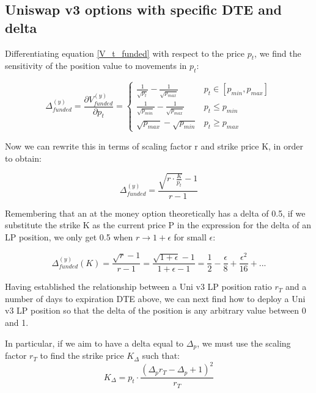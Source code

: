 \documentclass{article}
\begin{document}
\subsection{Uniswap v3 options with specific DTE and delta}
Differentiating equation \eqref{V_t_funded} with respect to the price $p_t$, we find the sensitivity of the position value to movements in $p_t$:

\begin{equation}
    \Delta^{(y)}_{funded} = \frac{\partial V_{funded}^{(y)}}{\partial p_t} =
    \begin{cases}
        \frac{1}{\sqrt{p_t}} - \frac{1}{\sqrt{p_{max}}} & p_t \in [p_{min},p_{max}] \\
        \frac{1}{\sqrt{p_{min}}} - \frac{1}{\sqrt{p_{max}}} & p_t \leq p_{min} \\
        \sqrt{p_{max}} - \sqrt{p_{min}} & p_t \geq p_{max}
    \end{cases}
\end{equation}

Now we can rewrite this in terms of scaling factor r and strike price K, in order to obtain:

\begin{equation}
    \Delta^{(y)}_{funded} = \frac{\sqrt{r \cdot \frac{K}{p_t}} - 1}{r-1}
\end{equation}

Remembering that an at the money option theoretically has a delta of 0.5, if we substitute the strike K as the current price P in the expression for the delta of an LP position, we only get 0.5 when $r \to 1 + \epsilon$ for small $\epsilon$:

\begin{equation}
    \Delta^{(y)}_{funded}(K) = \frac{\sqrt{r}-1}{r-1}=\frac{\sqrt{1 + \epsilon}-1}{1 + \epsilon -1} = \frac{1}{2} - \frac{\epsilon}{8} + \frac{\epsilon^2}{16}
+...\end{equation}

Having established the relationship between a Uni v3 LP position ratio $r_T$ and a number of days to expiration DTE above, we can next find how to deploy a Uni v3 LP position so that the delta of the position is any arbitrary value between 0 and 1.

In particular, if we aim to have a delta equal to $\Delta_p$, we must use the scaling factor $r_T$ to find the strike price $K_{\Delta}$ such that:
\begin{equation}
    K_{\Delta} = p_t \cdot \frac{(\Delta_pr_T - \Delta_p + 1)^2}{r_T}
\end{equation}
\end{document}
